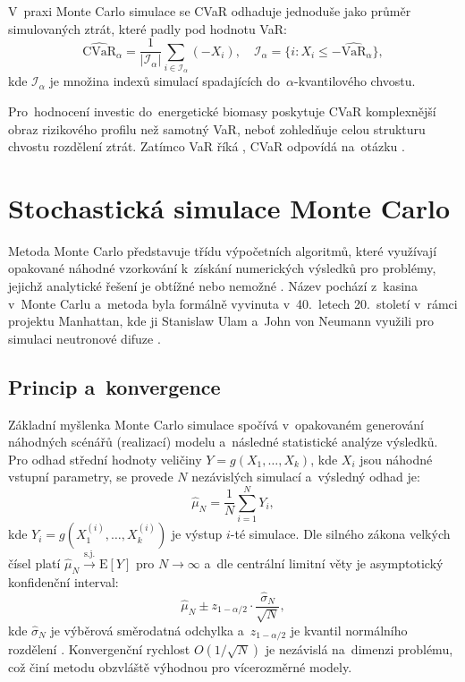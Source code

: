  V~praxi Monte Carlo simulace se CVaR odhaduje jednoduše jako průměr simulovaných ztrát, které padly pod hodnotu VaR:
\begin{equation}
  \widehat{\text{CVaR}}_{\alpha} = \frac{1}{|\mathcal{I}_{\alpha}|}\sum_{i \in \mathcal{I}_{\alpha}} (-X_i),
  \quad \mathcal{I}_{\alpha} = \{i : X_i \leq -\widehat{\text{VaR}}_{\alpha}\},
  \label{eq:cvar-empirical}
\end{equation}
kde $\mathcal{I}_{\alpha}$ je množina indexů simulací spadajících do~$\alpha$-kvantilového chvostu.

Pro~hodnocení investic do~energetické biomasy poskytuje CVaR 
komplexnější obraz rizikového profilu než samotný VaR, neboť 
zohledňuje celou strukturu chvostu rozdělení ztrát. Zatímco VaR 
říká , CVaR odpovídá 
na~otázku .


\section{Stochastická simulace Monte Carlo}
\label{sec:monte-carlo}

Metoda Monte Carlo představuje třídu výpočetních algoritmů, které využívají opakované náhodné vzorkování k~získání numerických výsledků pro problémy, jejichž analytické řešení je obtížné nebo nemožné \cite{Glasserman2003}. Název pochází z~kasina v~Monte Carlu a~metoda byla formálně vyvinuta v~40.~letech 20.~století v~rámci projektu Manhattan, kde ji Stanislaw Ulam a~John von Neumann využili pro simulaci neutronové difuze \cite{Metropolis1949}.

\subsection{Princip a~konvergence}
\label{subsec:mc-princip}

Základní myšlenka Monte Carlo simulace spočívá v~opakovaném generování náhodných scénářů (realizací) modelu a~následné statistické analýze výsledků. Pro odhad střední hodnoty veličiny $Y = g(X_1, \dots, X_k)$, kde $X_i$ jsou náhodné vstupní parametry, se provede $N$ nezávislých simulací a~výsledný odhad je:
\begin{equation}
  \hat{\mu}_N = \frac{1}{N}\sum_{i=1}^{N} Y_i,
  \label{eq:mc-estimator}
\end{equation}
kde $Y_i = g(X_1^{(i)}, \dots, X_k^{(i)})$ je výstup $i$-té simulace. Dle silného zákona velkých čísel platí $\hat{\mu}_N \xrightarrow{\text{s.j.}} \text{E}[Y]$ pro $N \to \infty$ a~dle centrální limitní věty je asymptotický konfidenční interval:
\begin{equation}
  \hat{\mu}_N \pm z_{1-\alpha/2} \cdot \frac{\hat{\sigma}_N}{\sqrt{N}},
  \label{eq:mc-ci}
\end{equation}
kde $\hat{\sigma}_N$ je výběrová směrodatná odchylka a~$z_{1-\alpha/2}$ je kvantil normálního rozdělení \cite{Glasserman2003}. Konvergenční rychlost $O(1/\sqrt{N})$ je nezávislá na~dimenzi problému, což činí metodu obzvláště výhodnou pro vícerozměrné modely.

